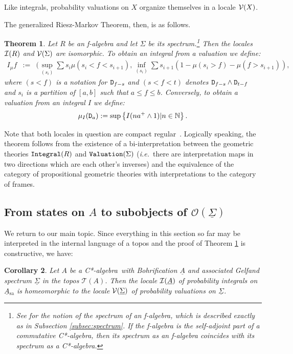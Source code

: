 \documentclass[12pt]{article}
\newcommand{\assign}{:=}
\newcommand{\ca}{C*-algebra} \newcommand{\jba}{JB-algebra}
\newcommand{\Sg}{\Sigma} \newcommand{\ta}{\tau} \newcommand{\ph}{\phi}
\newcommand{\alg}[1]{\ensuremath{#1}}
\newcommand{\functor}[1]{\ensuremath{\underline{#1}}}
\newcommand{\asstopos}{\ensuremath{\mathcal{T}}}
\newcommand{\sa}{\ensuremath{_{\mathrm{sa}}}}
\newcommand{\prop}[1]{\ensuremath{\mbox{\texttt{#1}}}}
\newcommand{\uS}{\underline{\Sigma}}
\newcommand{\uA}{\underline{A}}
\newcommand{\TA}{\mathcal{T}(A)}
\newcommand{\ie}{\textit{i.e.}}
\newcommand{\ulS}{\functor{\Sigma}}
\newcommand{\ulA}{\underline{A}}
\renewcommand{\TA}{\asstopos(\alg{A})}
\newtheorem{theorem}{Theorem}
\newtheorem{corollary}[theorem]{Corollary}
\begin{document}
Like integrals, probability valuations on $X$ organize themselves in a locale
${\mathcal V}(X)$.

The generalized Riesz-Markov Theorem, then, is as follows.
\begin{theorem}
\label{thm:CSI}
  {\normalfont\textbf{\cite{Coquand/Spitters:integrals-valuations}}}
  Let $R$ be an f-algebra and let $\Sigma$ be its
  spectrum.\footnote{See \cite{coquand05} for the notion of the
  spectrum of an f-algebra, which is described exactly as in
  Subsection \ref{subsec:spectrum}. If the f-algebra is the
  self-adjoint part of a commutative C*-algebra, then its spectrum as
  an f-algebra coincides with  its spectrum as a \ca.}
  Then
the locales ${\mathcal I}(R)$ and ${\mathcal V}(\Sigma)$
  are isomorphic. To obtain an integral from a valuation we define:
\[\begin{array}{lll}
  I_{\mu} f & \assign & (\sup_{(s_i)} \sum s_i \mu (s_i < f < s_{i+1}),
  \inf_{(s_i)} \sum s_{i + 1} (1-\mu (s_i > f) - \mu (f > s_{i+1})),
\end{array}\]
where $(s<f)$ is a notation for $\prop{D}_{f-s}$ and
$(s<f<t)$ denotes $\prop{D}_{f-s}\wedge \prop{D}_{t-f}$ and $s_i$ is a partition
of
$[a,b]$ such that $a\leqslant f\leqslant b$.
Conversely, to obtain a valuation from an integral $I$ we define:
\[\mu_I (\prop{D}_a) := \sup \left\{ I (n a^+ \wedge 1) | n \in \mathbb{N}
\right\}.\]

\end{theorem}
Note that  both locales in question are compact
regular~\cite{Coquand/Spitters:integrals-valuations}. Logically
speaking, the theorem follows from the existence of a
 bi-interpretation between the geometric theories $\prop{Integral}(R)$
and $\prop{Valuation}(\Sg)$  (\ie\ there are interpretation maps in two
directions which are each other's inverses) and the equivalence of
the category of
propositional geometric theories with interpretations
to the category of frames.

\subsection{From states on $A$ to subobjects of $\mathcal{O}(\ulS)$}\label{SSS}

We return to our main topic. Since everything in this section so far may be
interpreted in the internal language of a topos and the proof of Theorem
\ref{thm:CSI} is constructive, we have:
\begin{corollary}\label{thm:11}
  Let $A$ be a \ca\ with Bohrification $\ulA$ and associated Gelfand
  spectrum $\uS$ in the topos $\TA$. Then the locale $\CI(\ulA)$ of
  probability integrals on $\uA\sa$ is homeomorphic to the locale
  $\CV(\ulS)$ of probability valuations on $\ulS$.
\end{corollary}
\end{document}
